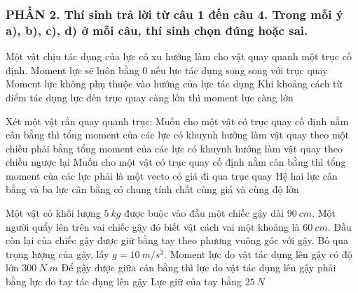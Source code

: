 \subsubsection*{PHẦN 2. Thí sinh trả lời từ câu 1 đến câu 4. Trong mỗi ý a), b), c), d) ở mỗi câu, thí sinh chọn đúng hoặc sai.}
\setcounter{ex}{0}
\begin{ex}%
Một vật chịu tác dụng của lực có xu hướng làm cho vật quay quanh một trục cố định.
{\True Moment lực sẽ luôn bằng $0$ nếu lực tác dụng song song với trục quay} 
{Moment lực không phụ thuộc vào hướng của lực tác dụng} 
{\True Khi khoảng cách từ điểm tác dụng lực đến trục quay càng lớn thì moment lực càng lớn} 
\loigiai{ 
\begin{itemchoice}
\itemch
\itemch
\itemch
\itemch
\end{itemchoice}
}
\end{ex}
\begin{ex}%
Xét một vật rắn quay quanh trục:
{\True Muốn cho một vật có trục quay cố định nằm cân bằng thì tổng moment của các lực có khuynh hướng làm vật quay theo một chiều phải bằng tổng moment của các lực có khuynh hướng làm vật quay theo chiều ngược lại} 
{Muốn cho một vật có trục quay cố định nằm cân bằng thì tổng moment của các lực phải là một vecto có giá đi qua trục quay} 
{Hệ hai lực cân bằng và ba lực cân bằng có chung tính chất cùng giá và cùng độ lớn} 
\loigiai{ 
\begin{itemchoice}
\itemch
\itemch
\itemch
\itemch
\end{itemchoice}
}
\end{ex}
\begin{ex}%
Một vật có khối lượng $5\ kg$ được buộc vào đầu một chiếc gậy dài $90\ cm$. Một người quẩy lên trên vai chiếc gậy đó biết vật cách vai một khoảng là $60\ cm$. Đầu còn lại của chiếc gậy được giữ bằng tay theo phương vuông góc với gậy. Bỏ qua trọng lượng của gậy, lấy $g=10 \ m/s^2$.
{Moment lực do vật tác dụng lên gậy có độ lớn $300\ N.m$} 
{Để gậy được giữa cân bằng thì lực do vật tác dụng lên gậy phải bằng lực do tay tác dụng lên gậy} 
{Lực giữ của tay bằng $25\ N$} 
\loigiai{ 
\begin{itemchoice}
\itemch
\itemch
\itemch
\itemch
\end{itemchoice}
}
\end{ex}
